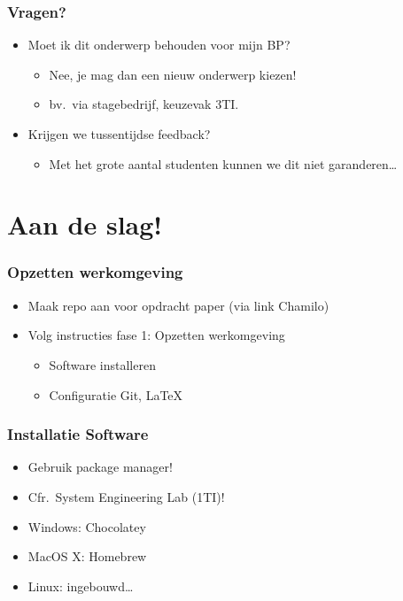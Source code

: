 \documentclass[aspectratio=169]{beamer}
\begin{document}
\begin{frame}
  \frametitle{Vragen?}

  \begin{itemize}
    \item Moet ik dit onderwerp behouden voor mijn BP?
          \begin{itemize}
            \item Nee, je mag dan een nieuw onderwerp kiezen!
            \item bv.\ via stagebedrijf, keuzevak 3TI.
          \end{itemize}
    \item Krijgen we tussentijdse feedback?
          \begin{itemize}
            \item Met het grote aantal studenten kunnen we dit niet garanderen\ldots
          \end{itemize}
  \end{itemize}
\end{frame}

\section{Aan de slag!}

\begin{frame}
  \frametitle{Opzetten werkomgeving}

  \begin{itemize}
    \item Maak repo aan voor opdracht paper (via link Chamilo)
    \item Volg instructies fase 1: Opzetten werkomgeving
          \begin{itemize}
            \item Software installeren
            \item Configuratie Git, LaTeX
          \end{itemize}
  \end{itemize}
\end{frame}

\begin{frame}
  \frametitle{Installatie Software}

  \begin{itemize}
    \item Gebruik package manager!
    \item Cfr.\ System Engineering Lab (1TI)!
    \item Windows: Chocolatey
    \item MacOS X: Homebrew
    \item Linux: ingebouwd\ldots
  \end{itemize}
\end{frame}
\end{document}
